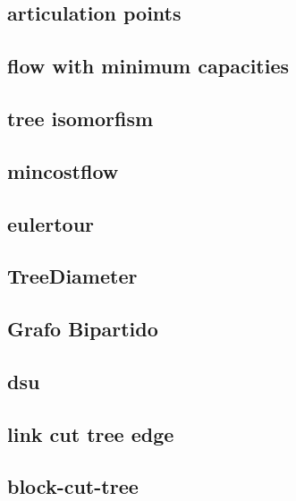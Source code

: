 \subsection{articulation points}
\raggedbottom
\hrulefill
\subsection{flow with minimum capacities}
\raggedbottom
\hrulefill
\subsection{tree isomorfism}
\raggedbottom
\hrulefill
\subsection{mincostflow}
\raggedbottom
\hrulefill
\subsection{eulertour}
\raggedbottom
\hrulefill
\subsection{TreeDiameter}
\raggedbottom
\hrulefill
\subsection{Grafo Bipartido}
\raggedbottom
\hrulefill
\subsection{dsu}
\raggedbottom
\hrulefill
\subsection{link cut tree edge}
\raggedbottom
\hrulefill
\subsection{block-cut-tree}
\raggedbottom
\hrulefill
